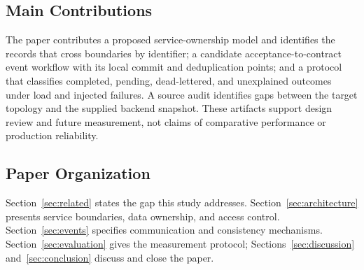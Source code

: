 \subsection{Main Contributions}
The paper contributes a proposed service-ownership model and identifies the records that cross boundaries by identifier; a candidate acceptance-to-contract event workflow with its local commit and deduplication points; and a protocol that classifies completed, pending, dead-lettered, and unexplained outcomes under load and injected failures. A source audit identifies gaps between the target topology and the supplied backend snapshot. These artifacts support design review and future measurement, not claims of comparative performance or production reliability.

\subsection{Paper Organization}
Section~\ref{sec:related} states the gap this study addresses. Section~\ref{sec:architecture} presents service boundaries, data ownership, and access control. Section~\ref{sec:events} specifies communication and consistency mechanisms. Section~\ref{sec:evaluation} gives the measurement protocol; Sections~\ref{sec:discussion} and~\ref{sec:conclusion} discuss and close the paper.
